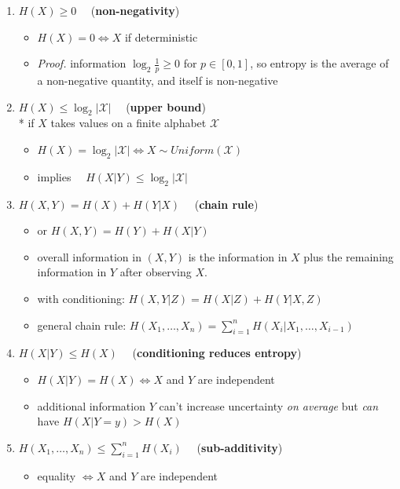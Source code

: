 \documentclass[10pt, landscape]{article}
\begin{document}
\begin{multicols*}{4}
  \begin{enumerate}
    \item $H(X) \geq 0 \quad$ (\textbf{non-negativity})
      \begin{itemize}
        \item $H(X)=0 \iff X$ if deterministic
        \item \textit{Proof.} information $\log_2\frac{1}{p} \geq 0$ for $p \in [0,1]$, so entropy is the average of a non-negative quantity, and itself is non-negative
      \end{itemize}
    \item $H(X) \leq \log_2 \vert\mathcal{X}\vert \quad$ (\textbf{upper bound}) \\* if $X$ takes values on a finite alphabet $ \mathcal{X} $
      \begin{itemize}
        \item $H(X) = \log_2\vert \mathcal{X}\vert \iff X\sim Uniform(\mathcal{X})$
        \item implies $\quad H(X \vert Y) \leq \log_2 \vert \mathcal{X} \vert$
      \end{itemize}
    \item $H(X, Y) = H(X) + H(Y\vert X) \quad$ (\textbf{chain rule})
      \begin{itemize}
        \item or $H(X, Y) = H(Y) + H(X\vert Y)$
        \item overall information in $(X, Y)$ is the information in $X$ plus the remaining information in $Y$ after observing $X$.
        \item with conditioning: $H(X, Y \vert Z) = H(X \vert Z) + H(Y \vert X, Z)$
        \item general chain rule: $H(X_1, \dots, X_n) = \sum^n_{i=1} H(X_i \vert X_1, \dots, X_{i-1})$
      \end{itemize}
    \item $H(X \vert Y) \leq H(X) \quad$ (\textbf{conditioning reduces entropy})
      \begin{itemize}
        \item $H(X \vert Y) = H(X) \iff X$ and $Y$ are independent
        \item additional information $Y$ can't increase uncertainty \textit{on average}
          but \textit{can} have $H(X \vert Y=y) > H(X)$
      \end{itemize}
    \item $H(X_1, \dots, X_n) \leq \sum^n_{i=1} H(X_i) \quad$ (\textbf{sub-additivity})
      \begin{itemize}
        \item equality $\iff X$ and $Y$ are independent
      \end{itemize}
  \end{enumerate}


\end{multicols*}
\end{document}
